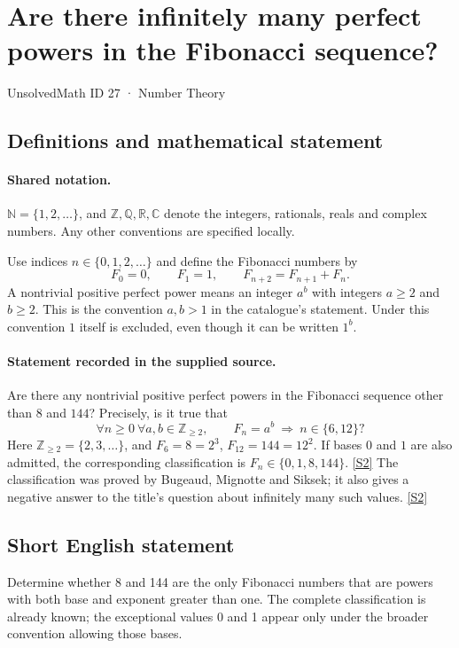 \documentclass[11pt]{article}
\newcommand{\sref}[2]{\hyperlink{source:#1:#2}{[S#2]}}
\begin{document}
\setcounter{section}{26}
\section{Are there infinitely many perfect powers in the Fibonacci sequence?}\label{27}
{\small\sffamily UnsolvedMath ID 27 · Number Theory}
\subsection{Definitions and mathematical statement}

\paragraph{Shared notation.}$\mathbb N=\{1,2,\ldots\}$, and $\mathbb Z,\mathbb Q,\mathbb R,\mathbb C$ denote the integers, rationals, reals and complex numbers. Any other conventions are specified locally.


Use indices $n\in\{0,1,2,\ldots\}$ and define the Fibonacci numbers by
\[
 F_0=0,\qquad F_1=1,\qquad F_{n+2}=F_{n+1}+F_n.
\]
A nontrivial positive perfect power means an integer $a^b$ with integers $a\ge2$ and $b\ge2$. This is the convention $a,b>1$ in the catalogue's statement. Under this convention $1$ itself is excluded, even though it can be written $1^b$.
\paragraph{Statement recorded in the supplied source.}
Are there any nontrivial positive perfect powers in the Fibonacci sequence other than $8$ and $144$? Precisely, is it true that
\[
 \forall n\ge0\ \forall a,b\in\mathbb Z_{\ge2},\qquad
 F_n=a^b\ \Longrightarrow\ n\in\{6,12\}?
\]
Here $\mathbb Z_{\ge2}=\{2,3,\ldots\}$, and $F_6=8=2^3$, $F_{12}=144=12^2$. If bases $0$ and $1$ are also admitted, the corresponding classification is $F_n\in\{0,1,8,144\}$. \sref{27}{2}
The classification was proved by Bugeaud, Mignotte and Siksek; it also gives a negative answer to the title's question about infinitely many such values. \sref{27}{2}
\subsection{Short English statement}
Determine whether 8 and 144 are the only Fibonacci numbers that are powers with both base and exponent greater than one. The complete classification is already known; the exceptional values 0 and 1 appear only under the broader convention allowing those bases.
\end{document}
